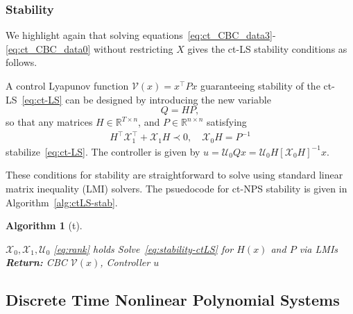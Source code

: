 \documentclass[sigconf]{acmart}
\newtheorem{algorithm}{Algorithm}
\begin{document}

\subsubsection{Stability}
We highlight again that solving equations~\eqref{eq:ct_CBC_data3}-\eqref{eq:ct_CBC_data0} without restricting $X$ gives the ct-LS stability conditions as follows.

\begin{theorem}
\label{thm:ctLS-stable}
A control Lyapunov function $\mathcal{V}(x)=x^\top Px$ guaranteeing stability of the ct-LS~\eqref{eq:ct-LS} can be designed by introducing the new variable
\begin{equation*}
\label{eq:Q=HP-ctLS}
Q=HP,
\end{equation*}
so that any matrices $H\in\mathbb{R}^{T\times n}$, and $P\in\mathbb{R}^{n\times n}$ satisfying
\begin{align}
\label{eq:stability-ctLS}
H^\top\mathcal{X}_{1}^\top + \mathcal{X}_{1}H \prec 0, \quad \mathcal{X}_{0}H=P^{-1}
\end{align}
stabilize~\eqref{eq:ct-LS}.
The controller is given by $u=\mathcal{U}_{0}Qx = \mathcal{U}_{0}H[\mathcal{X}_{0}H]^{-1}x.$
\end{theorem}

These conditions for stability are straightforward to solve using standard linear matrix inequality (LMI) solvers. The psuedocode for ct-NPS stability is given in Algorithm~\ref{alg:ctLS-stab}.

\begin{algorithm}[t]
\caption{Hierarchy for ct-LS Stability}\label{alg:ctLS-stab}
\begin{algorithmic}[1]
\Require $\mathcal{X}_0,\mathcal{X}_1,\mathcal{U}_0$
\Ensure \eqref{eq:rank} holds
\State Solve~\eqref{eq:stability-ctLS} for $H(x)$ and $P$ via LMIs
\noindent\Statex\textbf{Return:} CBC $\mathcal{V}(x)$, Controller $u$
\end{algorithmic}
\end{algorithm}

\subsection{Discrete Time Nonlinear Polynomial Systems}\label{subsec:discrete-time-nonlinear-polynomial-systems}
\end{document}
